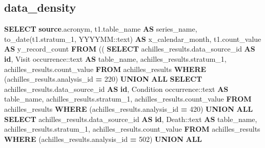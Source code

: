 \documentclass[
]{book}
\newenvironment{Shaded}{\begin{snugshade}}{\end{snugshade}}
\newcommand{\CharTok}[1]{\textcolor[rgb]{0.31,0.60,0.02}{#1}}
\newcommand{\DecValTok}[1]{\textcolor[rgb]{0.00,0.00,0.81}{#1}}
\newcommand{\FunctionTok}[1]{\textcolor[rgb]{0.00,0.00,0.00}{#1}}
\newcommand{\KeywordTok}[1]{\textcolor[rgb]{0.13,0.29,0.53}{\textbf{#1}}}
\newcommand{\NormalTok}[1]{#1}
\newcommand{\OperatorTok}[1]{\textcolor[rgb]{0.81,0.36,0.00}{\textbf{#1}}}
\newcommand{\StringTok}[1]{\textcolor[rgb]{0.31,0.60,0.02}{#1}}
\begin{document}
\hypertarget{data_density}{%
\subsection*{data\_density}\label{data_density}}

\begin{Shaded}
\begin{Highlighting}[]
\KeywordTok{SELECT} \KeywordTok{source}\NormalTok{.acronym,}
\NormalTok{   t1.table\_name }\KeywordTok{AS}\NormalTok{ series\_name,}
   \FunctionTok{to\_date}\NormalTok{(t1.stratum\_1, }\StringTok{\textquotesingle{}YYYYMM\textquotesingle{}}\NormalTok{:}\CharTok{:text}\NormalTok{) }\KeywordTok{AS}\NormalTok{ x\_calendar\_month,}
\NormalTok{   t1.count\_value }\KeywordTok{AS}\NormalTok{ y\_record\_count}
  \KeywordTok{FROM}\NormalTok{ (( }\KeywordTok{SELECT}\NormalTok{ achilles\_results.data\_source\_id }\KeywordTok{AS} \KeywordTok{id}\NormalTok{,}
           \StringTok{\textquotesingle{}Visit occurrence\textquotesingle{}}\NormalTok{:}\CharTok{:text} \KeywordTok{AS}\NormalTok{ table\_name,}
\NormalTok{           achilles\_results.stratum\_1,}
\NormalTok{           achilles\_results.count\_value}
          \KeywordTok{FROM}\NormalTok{ achilles\_results}
         \KeywordTok{WHERE}\NormalTok{ (achilles\_results.analysis\_id }\OperatorTok{=} \DecValTok{220}\NormalTok{)}
       \KeywordTok{UNION} \KeywordTok{ALL}
        \KeywordTok{SELECT}\NormalTok{ achilles\_results.data\_source\_id }\KeywordTok{AS} \KeywordTok{id}\NormalTok{,}
           \StringTok{\textquotesingle{}Condition occurrence\textquotesingle{}}\NormalTok{:}\CharTok{:text} \KeywordTok{AS}\NormalTok{ table\_name,}
\NormalTok{           achilles\_results.stratum\_1,}
\NormalTok{           achilles\_results.count\_value}
          \KeywordTok{FROM}\NormalTok{ achilles\_results}
         \KeywordTok{WHERE}\NormalTok{ (achilles\_results.analysis\_id }\OperatorTok{=} \DecValTok{420}\NormalTok{)}
       \KeywordTok{UNION} \KeywordTok{ALL}
        \KeywordTok{SELECT}\NormalTok{ achilles\_results.data\_source\_id }\KeywordTok{AS} \KeywordTok{id}\NormalTok{,}
           \StringTok{\textquotesingle{}Death\textquotesingle{}}\NormalTok{:}\CharTok{:text} \KeywordTok{AS}\NormalTok{ table\_name,}
\NormalTok{           achilles\_results.stratum\_1,}
\NormalTok{           achilles\_results.count\_value}
          \KeywordTok{FROM}\NormalTok{ achilles\_results}
         \KeywordTok{WHERE}\NormalTok{ (achilles\_results.analysis\_id }\OperatorTok{=} \DecValTok{502}\NormalTok{)}
       \KeywordTok{UNION} \KeywordTok{ALL}

\end{Highlighting}
\end{Shaded}
\end{document}
